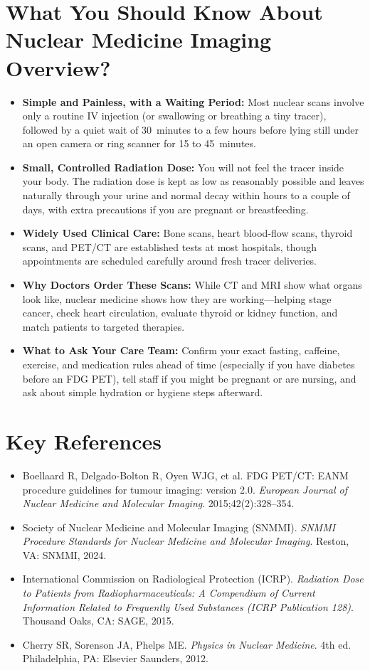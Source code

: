 \section{What You Should Know About Nuclear Medicine Imaging Overview?}
\begin{itemize}
  \item \textbf{Simple and Painless, with a Waiting Period:} Most nuclear scans involve only a routine IV injection (or swallowing or breathing a tiny tracer), followed by a quiet wait of 30~minutes to a few hours before lying still under an open camera or ring scanner for 15 to 45~minutes.
  \item \textbf{Small, Controlled Radiation Dose:} You will not feel the tracer inside your body. The radiation dose is kept as low as reasonably possible and leaves naturally through your urine and normal decay within hours to a couple of days, with extra precautions if you are pregnant or breastfeeding.
  \item \textbf{Widely Used Clinical Care:} Bone scans, heart blood-flow scans, thyroid scans, and PET/CT are established tests at most hospitals, though appointments are scheduled carefully around fresh tracer deliveries.
  \item \textbf{Why Doctors Order These Scans:} While CT and MRI show what organs look like, nuclear medicine shows how they are working---helping stage cancer, check heart circulation, evaluate thyroid or kidney function, and match patients to targeted therapies.
  \item \textbf{What to Ask Your Care Team:} Confirm your exact fasting, caffeine, exercise, and medication rules ahead of time (especially if you have diabetes before an FDG PET), tell staff if you might be pregnant or are nursing, and ask about simple hydration or hygiene steps afterward.
\end{itemize}

\section{Key References}
\begin{itemize}
  \item Boellaard R, Delgado-Bolton R, Oyen WJG, et al. FDG PET/CT: EANM procedure guidelines for tumour imaging: version 2.0. \emph{European Journal of Nuclear Medicine and Molecular Imaging}. 2015;42(2):328--354.
  \item Society of Nuclear Medicine and Molecular Imaging (SNMMI). \emph{SNMMI Procedure Standards for Nuclear Medicine and Molecular Imaging}. Reston, VA: SNMMI, 2024.
  \item International Commission on Radiological Protection (ICRP). \emph{Radiation Dose to Patients from Radiopharmaceuticals: A Compendium of Current Information Related to Frequently Used Substances (ICRP Publication 128)}. Thousand Oaks, CA: SAGE, 2015.
  \item Cherry SR, Sorenson JA, Phelps ME. \emph{Physics in Nuclear Medicine}. 4th ed. Philadelphia, PA: Elsevier Saunders, 2012.
\end{itemize}
